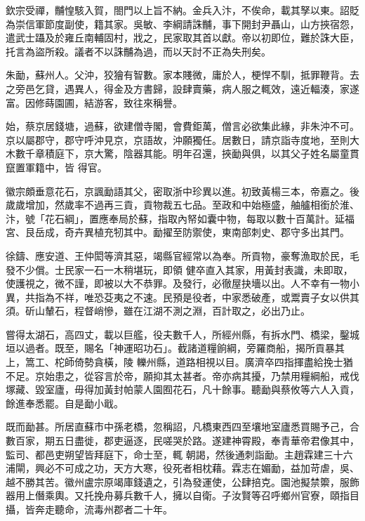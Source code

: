 \begin{pinyinscope}
 欽宗受禪，黼惶駭入賀，閤門以上旨不納。金兵入汴，不俟命，載其孥以東。詔貶為崇信軍節度副使，籍其家。吳敏、李綱請誅黼，事下開封尹聶山，山方挾宿怨，遣武士躡及於雍丘南輔固村，戕之，民家取其首以獻。帝以初即位，難於誅大臣，托言為盜所殺。議者不以誅黼為過，而以天討不正為失刑矣。



 朱勔，蘇州人。父沖，狡獪有智數。家本賤微，庸於人，梗悍不馴，抵罪鞭背。去之旁邑乞貸，遇異人，得金及方書歸，設肆賣藥，病人服之輒效，遠近輻湊，家遂富。因修蒔園圃，結游客，致往來稱譽。



 始，蔡京居錢塘，過蘇，欲建僧寺閣，會費鉅萬，僧言必欲集此緣，非朱沖不可。京以屬郡守，郡守呼沖見京，京語故，沖願獨任。居數日，請京詣寺度地，至則大木數千章積庭下，京大驚，陰器其能。明年召還，挾勔與俱，以其父子姓名屬童貫竄置軍籍中，皆
 得官。



 徽宗頗垂意花石，京諷勔語其父，密取浙中珍異以進。初致黃楊三本，帝嘉之。後歲歲增加，然歲率不過再三貢，貢物裁五七品。至政和中始極盛，舳艫相銜於淮、汴，號「花石綱」，置應奉局於蘇，指取內帑如囊中物，每取以數十百萬計。延福宮、艮岳成，奇卉異植充牣其中。勔擢至防禦使，東南部刺史、郡守多出其門。



 徐鑄、應安道、王仲閎等濟其惡，竭縣官經常以為奉。所貢物，豪奪漁取於民，毛發不少償。士民家一石一木稍堪玩，即領
 健卒直入其家，用黃封表識，未即取，使護視之，微不謹，即被以大不恭罪。及發行，必徹屋抉墻以出。人不幸有一物小異，共指為不祥，唯恐芟夷之不速。民預是役者，中家悉破產，或鬻賣子女以供其須。斫山輦石，程督峭慘，雖在江湖不測之淵，百計取之，必出乃止。



 嘗得太湖石，高四丈，載以巨艦，役夫數千人，所經州縣，有拆水門、橋梁，鑿城垣以過者。既至，賜名「神運昭功石」。截諸道糧餉綱，旁羅商船，揭所貢暴其上，篙工、柁師倚勢貪橫，陵
 轢州縣，道路相視以目。廣濟卒四指揮盡給挽士猶不足。京始患之，從容言於帝，願抑其太甚者。帝亦病其擾，乃禁用糧綱船，戒伐塚藏、毀室廬，毋得加黃封帕蒙人園囿花石，凡十餘事。聽勔與蔡攸等六人入貢，餘進奉悉罷。自是勔小戢。



 既而勔甚。所居直蘇市中孫老橋，忽稱詔，凡橋東西四至壤地室廬悉買賜予己，合數百家，期五日盡徙，郡吏逼逐，民嗟哭於路。遂建神霄殿，奉青華帝君像其中，監司、都邑吏朔望皆拜庭下，命士至，輒
 朝謁，然後通刺詣勔。主趙霖建三十六浦閘，興必不可成之功，天方大寒，役死者相枕藉。霖志在媚勔，益加苛虐，吳、越不勝其苦。徽州盧宗原竭庫錢遺之，引為發運使，公肆掊克。園池擬禁籞，服飾器用上僭乘輿。又托挽舟募兵數千人，擁以自衛。子汝賢等召呼鄉州官寮，頤指目攝，皆奔走聽命，流毒州郡者二十年。




\end{pinyinscope}
